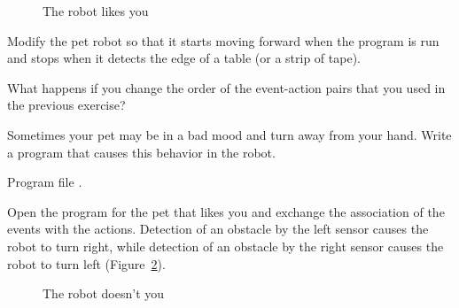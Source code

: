 \begin{figure}
\begin{center}
\caption{The robot likes you}\label{fig.likes}
\end{center}
\end{figure}


Modify the pet robot so that it starts moving forward when the program
is run and stops when it detects the edge of a table (or a strip of
tape).


What happens if you change the order of
the event-action pairs that you used in the previous exercise?




Sometimes your pet may be in a bad mood and turn away from your hand.
Write a program that causes this behavior in the robot.

{\raggedleft \hfill Program file .}

Open the program for the pet that likes you and exchange the association
of the events with the actions. Detection of an obstacle by the left
sensor causes the robot to turn right, while detection of an obstacle by
the right sensor causes the robot to turn left (Figure~\ref{fig.hates}).

\begin{figure}[htb]
\begin{center}
\caption{The robot doesn't you}\label{fig.hates}
\end{center}
\end{figure}

